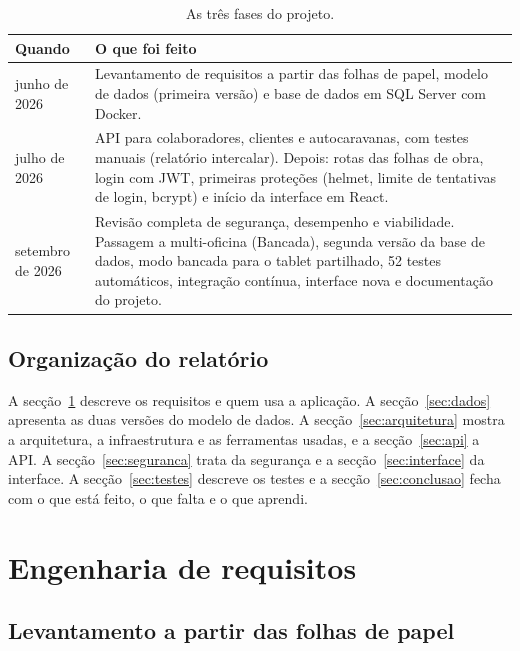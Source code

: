 \documentclass[a4paper,12pt]{article}
\begin{document}
\begin{table}[htbp]
\centering
\begin{tabularx}{\textwidth}{@{}p{3cm}L@{}}
\toprule
\textbf{Quando} & \textbf{O que foi feito} \\
\midrule
junho de 2026 & Levantamento de requisitos a partir das folhas de papel, modelo de dados (primeira versão) e base de dados em SQL Server com Docker. \\
julho de 2026 & \ac{API} para colaboradores, clientes e autocaravanas, com testes manuais (relatório intercalar). Depois: rotas das folhas de obra, login com \acs{JWT}, primeiras proteções (helmet, limite de tentativas de login, bcrypt) e início da interface em React. \\
setembro de 2026 & Revisão completa de segurança, desempenho e viabilidade. Passagem a multi-oficina (Bancada), segunda versão da base de dados, modo bancada para o tablet partilhado, 52 testes automáticos, integração contínua, interface nova e documentação do projeto. \\
\bottomrule
\end{tabularx}
\caption{As três fases do projeto.}
\label{tab:fases}
\end{table}

\subsection{Organização do relatório}

A secção~\ref{sec:requisitos} descreve os requisitos e quem usa a aplicação. A secção~\ref{sec:dados} apresenta as duas versões do modelo de dados. A secção~\ref{sec:arquitetura} mostra a arquitetura, a infraestrutura e as ferramentas usadas, e a secção~\ref{sec:api} a \ac{API}. A secção~\ref{sec:seguranca} trata da segurança e a secção~\ref{sec:interface} da interface. A secção~\ref{sec:testes} descreve os testes e a secção~\ref{sec:conclusao} fecha com o que está feito, o que falta e o que aprendi.

\section{Engenharia de requisitos}
\label{sec:requisitos}

\subsection{Levantamento a partir das folhas de papel}
\end{document}
